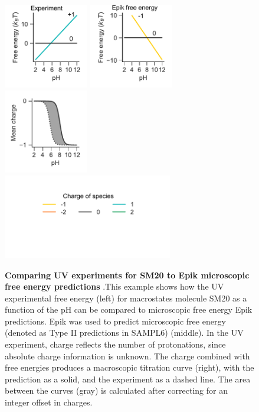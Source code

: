 \documentclass[9pt,lineno,final]{elife}
\begin{document}
\begin{figure}[H]
	\centering
	\includegraphics[width=0.33\textwidth]{Reports/Experiment-free-energy-SM20-titled.pdf}
	\includegraphics[width=0.33\textwidth]{Reports/Epik-TypeII-free-energy-SM20-titled.pdf}
	\includegraphics[width=0.33\textwidth]{Reports/Epik-TypeII-virtual-titration-SM20.pdf}\\
	\includegraphics[width=0.66\textwidth, trim={0 2cm 0 1cm},clip]{Reports/overview-charge-legend-2.pdf}
		\caption{{\bf Comparing UV experiments for SM20 to Epik microscopic free energy predictions} .This example shows how the UV experimental free energy (left) for macrostates molecule SM20 as a function of the pH can be compared to microscopic free energy Epik predictions. Epik was used to predict microscopic free energy (denoted as Type II predictions in SAMPL6) (middle). In the UV experiment, charge reflects the number of protonations, since absolute charge information is unknown. The charge combined with free energies produces a macroscopic titration curve (right), with the prediction as a solid, and the experiment as a dashed line. The area between the curves (gray) is calculated after correcting for an integer offset in charges.  
	\label{fig:epikii-prediction}}
\end{figure}
\end{document}
